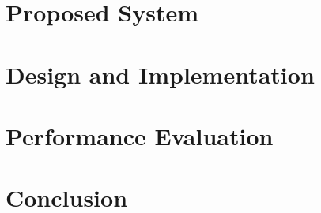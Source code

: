\documentclass[journal,onecolumn]{IEEEtran}
\begin{document}
  \section{Proposed System}
  
  \section{Design and Implementation}
  
  \section{Performance Evaluation}

  \section{Conclusion}

  
  
\end{document}
